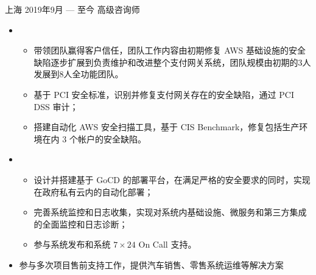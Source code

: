 \documentclass{resume}
\begin{document}
\begin{body}
	{上海}
	{2019年9月 --- 至今}
	{高级咨询师}
	\begin{itemize}[noitemsep,topsep=0pt]
		\item {}
		\begin{itemize}[noitemsep,topsep=0pt]
			\item 带领团队赢得客户信任，团队工作内容由初期修复 AWS 基础设施的安全缺陷逐步扩展到负责维护和改进整个支付网关系统，团队规模由初期的3人发展到8人全功能团队。
			\item 基于 PCI 安全标准，识别并修复支付网关存在的安全缺陷，通过 PCI DSS 审计；
			\item 搭建自动化 AWS 安全扫描工具，基于 CIS Benchmark，修复包括生产环境在内 3 个帐户的安全缺陷。
		\end{itemize}
		\item {}
		\begin{itemize}[noitemsep,topsep=0pt]
			\item 设计并搭建基于 GoCD 的部署平台，在满足严格的安全要求的同时，实现在政府私有云内的自动化部署；
			\item 完善系统监控和日志收集，实现对系统内基础设施、微服务和第三方集成的全面监控和日志诊断；
			\item 参与系统发布和系统 $7\times 24$ On Call 支持。
		\end{itemize}
		\item 参与多次项目售前支持工作，提供汽车销售、零售系统运维等解决方案
	\end{itemize}


\end{body}
\end{document}
